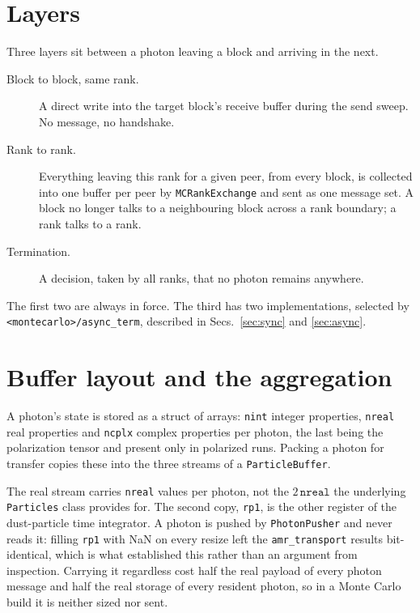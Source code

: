 \documentclass[11pt]{article}
\begin{document}
\section{Layers}

Three layers sit between a photon leaving a block and arriving in the next.

\begin{description}
\item[Block to block, same rank.] A direct write into the target block's receive buffer
during the send sweep. No message, no handshake.

\item[Rank to rank.] Everything leaving this rank for a given peer, from every block, is
collected into one buffer per peer by \texttt{MCRankExchange} and sent as one message set.
A block no longer talks to a neighbouring block across a rank boundary; a rank talks to a
rank.

\item[Termination.] A decision, taken by all ranks, that no photon remains anywhere.
\end{description}

The first two are always in force. The third has two implementations, selected by
\texttt{<montecarlo>/async\_term}, described in Secs.~\ref{sec:sync} and \ref{sec:async}.

\section{Buffer layout and the aggregation}
\label{sec:layout}

A photon's state is stored as a struct of arrays: \texttt{nint} integer properties,
\texttt{nreal} real properties and \texttt{ncplx} complex properties per photon, the last
being the polarization tensor and present only in polarized runs. Packing a photon for
transfer copies these into the three streams of a \texttt{ParticleBuffer}.

The real stream carries \texttt{nreal} values per photon, not the $2\,\texttt{nreal}$ the
underlying \texttt{Particles} class provides for. The second copy, \texttt{rp1}, is the
other register of the dust-particle time integrator. A photon is pushed by
\texttt{PhotonPusher} and never reads it: filling \texttt{rp1} with NaN on every resize left
the \texttt{amr\_transport} results bit-identical, which is what established this rather
than an argument from inspection. Carrying it regardless cost half the real payload of every
photon message and half the real storage of every resident photon, so in a Monte Carlo build
it is neither sized nor sent.
\end{document}
